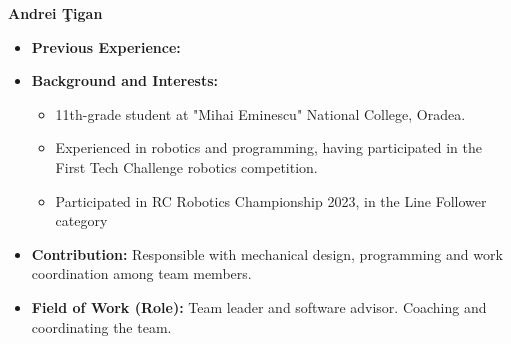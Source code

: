 \item[] \textbf{Andrei \c{T}igan}
    \begin{itemize}[label=]
        \item[\faCogs] \textbf{Previous Experience:} 
        \item[\faGraduationCap] \textbf{Background and Interests:} 
        \begin{itemize}[label=\textbullet]
            \item 11th-grade student at "Mihai Eminescu" National College, Oradea.
             \item Experienced in robotics and programming, having participated in the First Tech Challenge robotics competition.
            \item Participated in RC Robotics Championship 2023, in the Line Follower category
        \end{itemize}
        \item[\faEdit] \textbf{Contribution:} Responsible with mechanical design, programming and work coordination among team members.
        \item[\faMicroscope] \textbf{Field of Work (Role):} Team leader and software advisor. Coaching and coordinating the team.
    \end{itemize}
    \vspace{0.2 cm}
    